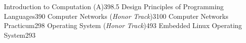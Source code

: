 
\begin{cvcourses}
    \cvcourse
        {Introduction to Computation (A)}{3}{98.5}
        {Design Principles of Programming Languages}{3}{90}
    \cvcourse
        {Computer Networks (\textit{Honor Track})}{3}{100}
        {Computer Networks Practicum}{2}{98}
    \cvcourse
        {Operating System (\textit{Honor Track})}{4}{93}
        {Embedded Linux Operating System}{2}{93}
\end{cvcourses}
